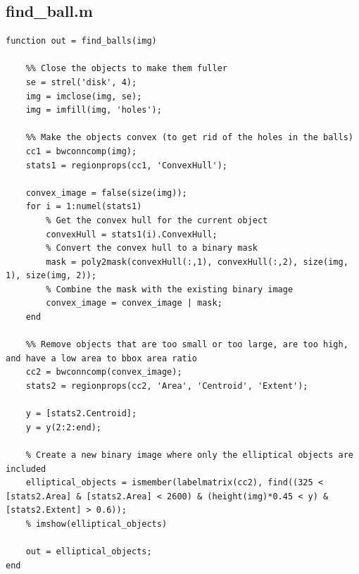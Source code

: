 \documentclass[conference]{IEEEtran}
\begin{document}
        \subsection{find\_ball.m}
            \begin{lstlisting}[style=Matlab-editor, basicstyle=\scriptsize]
function out = find_balls(img)

    %% Close the objects to make them fuller
    se = strel('disk', 4);
    img = imclose(img, se);
    img = imfill(img, 'holes');
    
    %% Make the objects convex (to get rid of the holes in the balls)
    cc1 = bwconncomp(img);
    stats1 = regionprops(cc1, 'ConvexHull');

    convex_image = false(size(img));
    for i = 1:numel(stats1)
        % Get the convex hull for the current object
        convexHull = stats1(i).ConvexHull;     
        % Convert the convex hull to a binary mask
        mask = poly2mask(convexHull(:,1), convexHull(:,2), size(img, 1), size(img, 2));
        % Combine the mask with the existing binary image
        convex_image = convex_image | mask;
    end

    %% Remove objects that are too small or too large, are too high, and have a low area to bbox area ratio
    cc2 = bwconncomp(convex_image);
    stats2 = regionprops(cc2, 'Area', 'Centroid', 'Extent');
    
    y = [stats2.Centroid];
    y = y(2:2:end);
    
    % Create a new binary image where only the elliptical objects are included
    elliptical_objects = ismember(labelmatrix(cc2), find((325 < [stats2.Area] & [stats2.Area] < 2600) & (height(img)*0.45 < y) & [stats2.Extent] > 0.6));
    % imshow(elliptical_objects)

    out = elliptical_objects;
end
                
            \end{lstlisting}
\end{document}

